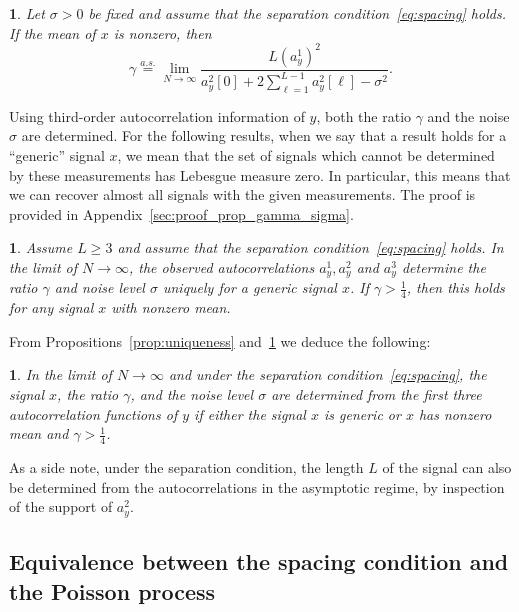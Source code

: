 \documentclass[12pt]{article}
\newcommand{\1}{\mathbf{1}}
\newcommand{\aseq}{\stackrel{a.s.}{=}}
\theoremstyle{plain}
\theoremstyle{definition}
\theoremstyle{remark}
\theoremstyle{plain}
\theoremstyle{remark}
\theoremstyle{plain}
\newtheorem{corollary}[thm]{\protect\corollaryname}
\theoremstyle{plain}
\newtheorem{proposition}[thm]{\protect\propositionname}
\providecommand{\corollaryname}{Corollary}
\providecommand{\propositionname}{Proposition}
\begin{document}
\begin{proposition} \label{prop:gamma}
	Let $\sigma > 0$ be fixed and assume that the separation condition~\eqref{eq:spacing} holds. If the mean of $x$ is nonzero, then 
	\begin{equation}
	\gamma  \aseq \lim_{N \to \infty}\frac{L (a^1_y)^2}{a_y^2[0] + 2\sum_{\ell = 1}^{L-1}a_y^2[\ell]-\sigma^2}.
	\end{equation}
\end{proposition}

Using third-order autocorrelation information of $y$, both the ratio $\gamma$ and the noise $\sigma$ are determined. For the following results, when we say that a result holds for a ``generic'' signal $x$, we mean that the set of signals which cannot be determined by these measurements
has Lebesgue measure zero. 
In particular, this means that we can recover
almost all signals with the given measurements. The proof is provided in Appendix~\ref{sec:proof_prop_gamma_sigma}.

\begin{proposition} \label{prop:gamma_sigma}
	Assume $L \geq 3$ and assume that the separation condition~\eqref{eq:spacing} holds. 
	In the limit of $N\to \infty$, the observed autocorrelations $a_y^1,a_y^2$ and  $a_y^3$ determine the ratio $\gamma$ and noise level $\sigma$ uniquely for a generic signal $x$. If $\gamma > \frac{1}{4}$, then this holds for any signal $x$ with nonzero mean. 
\end{proposition}

From Propositions~\ref{prop:uniqueness} and~\ref{prop:gamma_sigma} we   deduce the following:
\begin{corollary}
	In the limit of $N\to \infty$ and under the separation condition~\eqref{eq:spacing}, the signal $x$, the ratio $\gamma$, and the noise level $\sigma$ are determined from the first three autocorrelation functions of $y$ if either the signal $x$ is generic or $x$ has nonzero mean  and $\gamma > \frac{1}{4}$.
\end{corollary}

As a side note, under the separation condition, the length $L$ of the signal can also be determined from the autocorrelations in the asymptotic regime, by inspection of the support of $a_y^2$.


\subsection{Equivalence between the spacing condition and the Poisson process} \label{sec:support}
\end{document}
